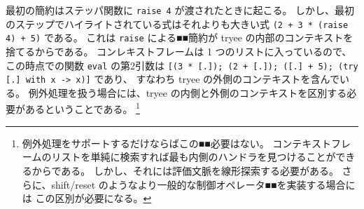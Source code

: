 \noindent 最初の簡約はステッパ関数に \texttt{raise 4} が渡されたときに起こる。
しかし、最初のステップでハイライトされている式はそれよりも大きい式
\texttt{(2 + 3 * (raise 4) + 5)} である。
これは \texttt{raise} による■■簡約が tryee の内部のコンテキストを捨てるからである。
コンレキストフレームは 1 つのリストに入っているので、この時点での関数 \texttt{eval} の第2引数は
\texttt{[(3 * [.]); (2 + [.]);\ ([.]\ + 5);\ (try [.]\ with x -> x)]} であり、
すなわち tryee の外側のコンテキストを含んでいる。
例外処理を扱う場合には、tryee の内側と外側のコンテキストを区別する必要があるということである。
\footnote{
例外処理をサポートするだけならばこの■■必要はない。
コンテキストフレームのリストを単純に検索すれば最も内側のハンドラを見つけることができるからである。
しかし、それには評価文脈を線形探索する必要がある。
さらに、shift/reset のようなより一般的な制御オペレータ■■を実装する場合には
この区別が必要になる。
}

